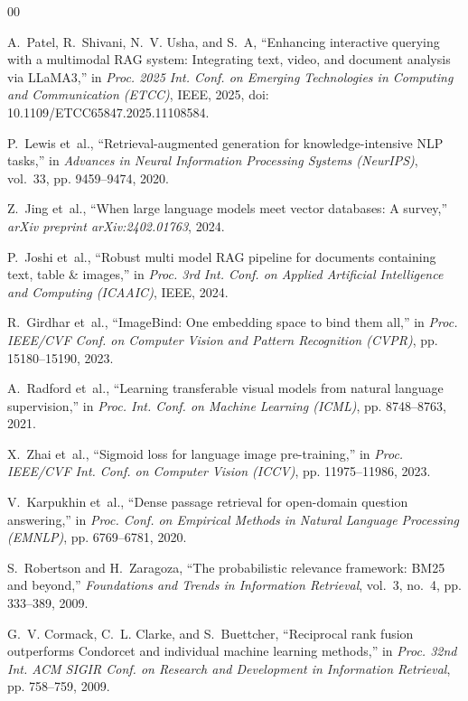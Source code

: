 \documentclass[conference]{IEEEtran}
\begin{document}
\begin{thebibliography}{00}

A.~Patel, R.~Shivani, N.~V. Usha, and S.~A, ``Enhancing interactive querying with a multimodal RAG system: Integrating text, video, and document analysis via LLaMA3,'' in \emph{Proc. 2025 Int. Conf. on Emerging Technologies in Computing and Communication (ETCC)}, IEEE, 2025, doi: 10.1109/ETCC65847.2025.11108584.

P.~Lewis et~al., ``Retrieval-augmented generation for knowledge-intensive NLP tasks,'' in \emph{Advances in Neural Information Processing Systems (NeurIPS)}, vol.~33, pp. 9459--9474, 2020.

Z.~Jing et~al., ``When large language models meet vector databases: A survey,'' \emph{arXiv preprint arXiv:2402.01763}, 2024.

P.~Joshi et~al., ``Robust multi model RAG pipeline for documents containing text, table \& images,'' in \emph{Proc. 3rd Int. Conf. on Applied Artificial Intelligence and Computing (ICAAIC)}, IEEE, 2024.

R.~Girdhar et~al., ``ImageBind: One embedding space to bind them all,'' in \emph{Proc. IEEE/CVF Conf. on Computer Vision and Pattern Recognition (CVPR)}, pp. 15180--15190, 2023.

A.~Radford et~al., ``Learning transferable visual models from natural language supervision,'' in \emph{Proc. Int. Conf. on Machine Learning (ICML)}, pp. 8748--8763, 2021.

X.~Zhai et~al., ``Sigmoid loss for language image pre-training,'' in \emph{Proc. IEEE/CVF Int. Conf. on Computer Vision (ICCV)}, pp. 11975--11986, 2023.

V.~Karpukhin et~al., ``Dense passage retrieval for open-domain question answering,'' in \emph{Proc. Conf. on Empirical Methods in Natural Language Processing (EMNLP)}, pp. 6769--6781, 2020.

S.~Robertson and H.~Zaragoza, ``The probabilistic relevance framework: BM25 and beyond,'' \emph{Foundations and Trends in Information Retrieval}, vol.~3, no.~4, pp. 333--389, 2009.

G.~V. Cormack, C.~L. Clarke, and S.~Buettcher, ``Reciprocal rank fusion outperforms Condorcet and individual machine learning methods,'' in \emph{Proc. 32nd Int. ACM SIGIR Conf. on Research and Development in Information Retrieval}, pp. 758--759, 2009.


\end{thebibliography}
\end{document}
